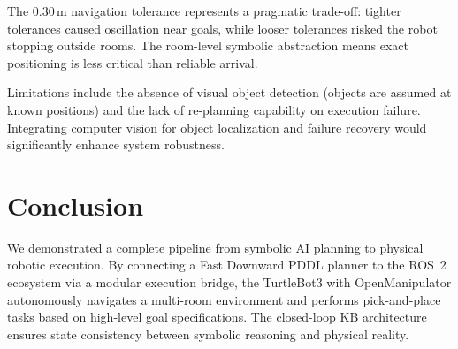 \documentclass[conference]{IEEEtran}
\begin{document}
The 0.30\,m navigation tolerance represents a pragmatic trade-off: tighter tolerances caused oscillation near goals, while looser tolerances risked the robot stopping outside rooms. The room-level symbolic abstraction means exact positioning is less critical than reliable arrival.

Limitations include the absence of visual object detection (objects are assumed at known positions) and the lack of re-planning capability on execution failure. Integrating computer vision for object localization and failure recovery would significantly enhance system robustness.

\section{Conclusion}

We demonstrated a complete pipeline from symbolic AI planning to physical robotic execution. By connecting a Fast Downward PDDL planner to the ROS~2 ecosystem via a modular execution bridge, the TurtleBot3 with OpenManipulator autonomously navigates a multi-room environment and performs pick-and-place tasks based on high-level goal specifications. The closed-loop KB architecture ensures state consistency between symbolic reasoning and physical reality.

\end{document}

